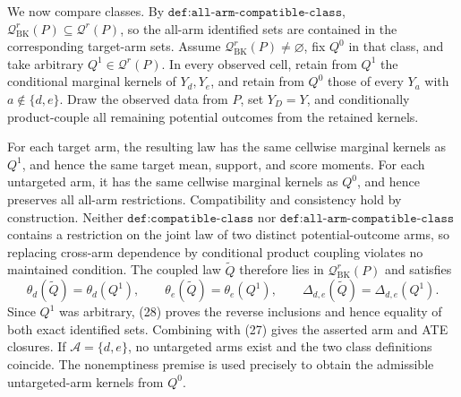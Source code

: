 We now compare classes.  By \(\texttt{def:all-arm-compatible-class}\),
\(\mathcal Q_{\mathrm{BK}}^r(P)\subseteq\mathcal Q^r(P)\), so the all-arm identified sets are contained in the corresponding target-arm sets.  Assume \(\mathcal Q_{\mathrm{BK}}^r(P)\ne\varnothing\), fix \(Q^0\) in that class, and take arbitrary \(Q^1\in\mathcal Q^r(P)\).  In every observed cell, retain from \(Q^1\) the conditional marginal kernels of \(Y_d,Y_e\), and retain from \(Q^0\) those of every \(Y_a\) with \(a\notin\{d,e\}\).  Draw the observed data from \(P\), set \(Y_D=Y\), and conditionally product-couple all remaining potential outcomes from the retained kernels.

For each target arm, the resulting law has the same cellwise marginal kernels as \(Q^1\), and hence the same target mean, support, and score moments.  For each untargeted arm, it has the same cellwise marginal kernels as \(Q^0\), and hence preserves all all-arm restrictions.  Compatibility and consistency hold by construction.  Neither \(\texttt{def:compatible-class}\) nor \(\texttt{def:all-arm-compatible-class}\) contains a restriction on the joint law of two distinct potential-outcome arms, so replacing cross-arm dependence by conditional product coupling violates no maintained condition.  The coupled law \(\widetilde Q\) therefore lies in \(\mathcal Q_{\mathrm{BK}}^r(P)\) and satisfies
\[
 \theta_d(\widetilde Q)=\theta_d(Q^1),\qquad
 \theta_e(\widetilde Q)=\theta_e(Q^1),\qquad
 \Delta_{d,e}(\widetilde Q)=\Delta_{d,e}(Q^1).                               \tag{28}
\]
Since \(Q^1\) was arbitrary, (28) proves the reverse inclusions and hence equality of both exact identified sets.  Combining with (27) gives the asserted arm and ATE closures.  If \(\mathcal A=\{d,e\}\), no untargeted arms exist and the two class definitions coincide.  The nonemptiness premise is used precisely to obtain the admissible untargeted-arm kernels from \(Q^0\).

